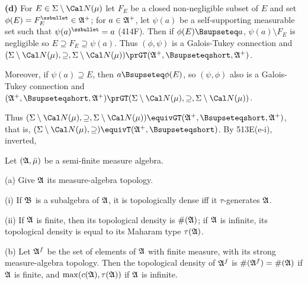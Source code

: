 {\medskip

{\bf (d)} For $E\in\Sigma\setminus\Cal N(\mu)$ let $F_E$ be a closed
non-negligible subset of $E$ and set
$\phi(E)=F_E^{\ssbullet}\in\frak A^+$;  for $a\in\frak A^+$, let
$\psi(a)$ be a self-supporting measurable set such that
$\psi(a)^{\ssbullet}=a$ (414F).   Then if $\phi(E)\Bsupseteq a$,
$\psi(a)\setminus F_E$ is negligible so
$E\supseteq F_E\supseteq\psi(a)$.   Thus $(\phi,\psi)$ is a Galois-Tukey
connection and
$(\Sigma\setminus\Cal N(\mu),\supseteq,\Sigma\setminus\Cal N(\mu))
\prGT(\frak A^+,\Bsupseteqshort,\frak A^+)$.

Moreover, if $\psi(a)\supseteq E$, then $a\Bsupseteq\phi(E)$, so
$(\psi,\phi)$ also is a Galois-Tukey connection and
$(\frak A^+,\Bsupseteqshort,\frak A^+)\prGT
(\Sigma\setminus\Cal N(\mu),\discretionary{}{}{}\supseteq\nobreak,
\discretionary{}{}{}\Sigma\setminus\Cal N(\mu))$.

Thus $(\Sigma\setminus\Cal N(\mu),\supseteq,\Sigma\setminus\Cal N(\mu))
\equivGT(\frak A^+,\Bsupseteqshort,\frak A^+)$, that is,
$(\Sigma\setminus\Cal N(\mu),\supseteq)
\equivT(\frak A^+,\Bsupseteqshort)$.   By 513E(e-i), inverted,

}%

 Let $(\frak A,\bar\mu)$ be a semi-finite
measure algebra.

(a) Give $\frak A$ its measure-algebra topology.

\quad(i) If $\frak B$ is a subalgebra of $\frak A$, it is topologically
dense iff it $\tau$-generates $\frak A$.

\quad(ii) If
$\frak A$ is finite, then its topological density is $\#(\frak A)$;  if
$\frak A$ is infinite, its topological density is equal to its Maharam
type $\tau(\frak A)$.

(b) Let $\frak A^f$ be the set of elements of $\frak A$ with
finite measure, with its strong measure-algebra
topology.   Then the
topological density of $\frak A^f$ is $\#(\frak A^f)=\#(\frak A)$ if
$\frak A$
is finite, and $\max(c(\frak A),\tau(\frak A))$ if $\frak A$ is infinite.

